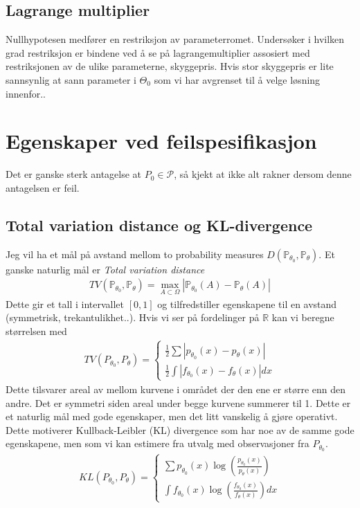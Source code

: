 \subsection{Lagrange multiplier}
Nullhypotesen medfører en restriksjon av parameterromet. Undersøker i hvilken grad restriksjon er bindene ved å se på lagrangemultiplier assosiert med restriksjonen av de ulike parameterne, skyggepris. Hvis stor skyggepris er lite sannsynlig at sann parameter i $\Theta_0$ som vi har avgrenset til å velge løsning innenfor..
\section{Egenskaper ved feilspesifikasjon}
Det er ganske sterk antagelse at $P_0 \in \mathscr{P}$, så kjekt at ikke alt rakner dersom denne antagelsen er feil.
\subsection{Total variation distance og KL-divergence}
Jeg vil ha et mål på avstand mellom to probability measures $D(\mathbb{P}_{\theta_0},\mathbb{P}_{\theta})$. Et ganske naturlig mål er \textit{Total variation distance}
\begin{align}
TV(\mathbb{P}_{\theta_0},\mathbb{P}_{\theta})=\max_{A \subset \Omega} |\mathbb{P}_{\theta_0}(A)-\mathbb{P}_{\theta}(A)|
\end{align}
Dette gir et tall i intervallet $[0,1]$ og tilfredstiller egenskapene til en avstand (symmetrisk, trekantulikhet..). Hvis vi ser på fordelinger på $\mathbb{R}$ kan vi beregne størrelsen med
\begin{align}
TV(P_{\theta_0},P_{\theta}) = 
\begin{cases}
\frac{1}{2}\sum | p_{\theta_0}(x)-p_{\theta}(x)| \\
\frac{1}{2}\int | f_{\theta_0}(x)-f_{\theta}(x)|dx
\end{cases}
\end{align}
Dette tilsvarer areal av mellom kurvene i området der den ene er større enn den andre. Det er symmetri siden areal under begge kurvene summerer til 1. Dette er et naturlig mål med gode egenskaper, men det litt vanskelig å gjøre operativt. Dette motiverer Kullback-Leibler (KL) divergence som har noe av de samme gode egenskapene, men som vi kan estimere fra utvalg med observasjoner fra $P_{\theta_0}$.
\begin{align}
KL(P_{\theta_0},P_{\theta}) = \begin{cases}
\sum p_{\theta_0}(x)\log\left(\frac{p_{\theta_0}(x)}{p_{\theta}(x)}\right) \\
\int f_{\theta_0}(x)\log\left(\frac{f_{\theta_0}(x)}{f_{\theta}(x)}\right)dx
\end{cases}
\end{align}
